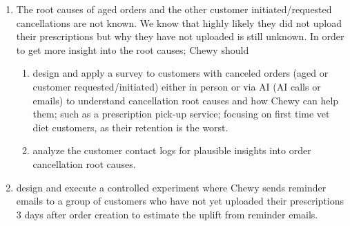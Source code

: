 \begin{enumerate}
\item The root causes of aged orders and the other customer
  initiated/requested cancellations are not known. We know that highly
  likely they did not upload their prescriptions but why they have not
  uploaded is still unknown. In order to get more insight into the
  root causes; Chewy should
\begin{enumerate}
\item design and apply a survey to customers with canceled orders
  (aged or customer requested/initiated) either in person or via AI
  (AI calls or emails) to understand cancellation root causes and how
  Chewy can help them; such as a prescription pick-up service;
  focusing on first time vet diet customers, as their retention is the
  worst.
\item analyze the customer contact logs for plausible insights into
  order cancellation root causes.
\end{enumerate}
\item design and execute a controlled experiment where Chewy sends
  reminder emails to a group of customers who have not yet uploaded their
  prescriptions 3 days after order creation to estimate the uplift
  from reminder emails.
\end{enumerate}
